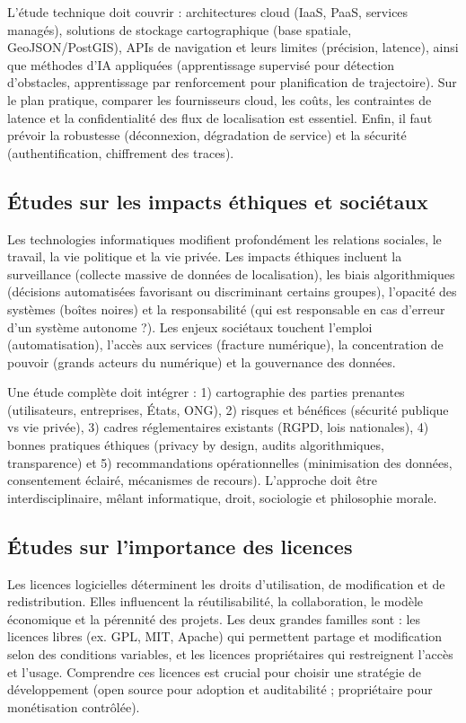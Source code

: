 L’étude technique doit couvrir : architectures cloud (IaaS, PaaS, services managés), solutions de stockage cartographique (base spatiale, GeoJSON/PostGIS), APIs de navigation et leurs limites (précision, latence), ainsi que méthodes d’IA appliquées (apprentissage supervisé pour détection d’obstacles, apprentissage par renforcement pour planification de trajectoire). Sur le plan pratique, comparer les fournisseurs cloud, les coûts, les contraintes de latence et la confidentialité des flux de localisation est essentiel. Enfin, il faut prévoir la robustesse (déconnexion, dégradation de service) et la sécurité (authentification, chiffrement des traces).

\subsection{Études sur les impacts éthiques et sociétaux}
Les technologies informatiques modifient profondément les relations sociales, le travail, la vie politique et la vie privée. Les impacts éthiques incluent la surveillance (collecte massive de données de localisation), les biais algorithmiques (décisions automatisées favorisant ou discriminant certains groupes), l’opacité des systèmes (boîtes noires) et la responsabilité (qui est responsable en cas d’erreur d’un système autonome ?). Les enjeux sociétaux touchent l’emploi (automatisation), l’accès aux services (fracture numérique), la concentration de pouvoir (grands acteurs du numérique) et la gouvernance des données.

Une étude complète doit intégrer : 1) cartographie des parties prenantes (utilisateurs, entreprises, États, ONG), 2) risques et bénéfices (sécurité publique vs vie privée), 3) cadres réglementaires existants (RGPD, lois nationales), 4) bonnes pratiques éthiques (privacy by design, audits algorithmiques, transparence) et 5) recommandations opérationnelles (minimisation des données, consentement éclairé, mécanismes de recours). L’approche doit être interdisciplinaire, mêlant informatique, droit, sociologie et philosophie morale.

\subsection{Études sur l’importance des licences}
Les licences logicielles déterminent les droits d’utilisation, de modification et de redistribution. Elles influencent la réutilisabilité, la collaboration, le modèle économique et la pérennité des projets. Les deux grandes familles sont : les licences libres (ex. GPL, MIT, Apache) qui permettent partage et modification selon des conditions variables, et les licences propriétaires qui restreignent l’accès et l’usage. Comprendre ces licences est crucial pour choisir une stratégie de développement (open source pour adoption et auditabilité ; propriétaire pour monétisation contrôlée).

